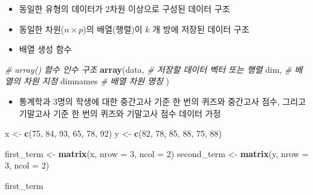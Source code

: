 \documentclass[
  11pt,
]{krantz}
\newenvironment{Shaded}{\begin{snugshade}}{\end{snugshade}}
\newcommand{\CommentTok}[1]{\textcolor[rgb]{0.37,0.37,0.37}{\textit{#1}}}
\newcommand{\DataTypeTok}[1]{\textcolor[rgb]{0.27,0.27,0.27}{#1}}
\newcommand{\DecValTok}[1]{\textcolor[rgb]{0.06,0.06,0.06}{#1}}
\newcommand{\KeywordTok}[1]{\textcolor[rgb]{0.27,0.27,0.27}{\textbf{#1}}}
\newcommand{\NormalTok}[1]{#1}
\newcommand{\StringTok}[1]{\textcolor[rgb]{0.5,0.5,0.5}{#1}}
\providecommand{\tightlist}{%
  \setlength{\itemsep}{0pt}\setlength{\parskip}{0pt}}
\begin{document}
\begin{itemize}
\tightlist
\item
  동일한 유형의 데이터가 2차원 이상으로 구성된 데이터 구조
\item
  동일한 차원(\(n\times p\))의 배열(행렬)이 \(k\) 개 방에 저장된 데이터 구조
\item
  배열 생성 함수
\end{itemize}

\footnotesize

\begin{Shaded}
\begin{Highlighting}[]
\CommentTok{# array() 함수 인수 구조}
\KeywordTok{array}\NormalTok{(data, }\CommentTok{# 저장할 데이터 벡터 또는 행렬}
\NormalTok{      dim,  }\CommentTok{# 배열의 차원 지정}
\NormalTok{      dimnames }\CommentTok{# 배열 차원 명칭}
\NormalTok{      )}
\end{Highlighting}
\end{Shaded}

\normalsize

\begin{itemize}
\tightlist
\item
  통계학과 3명의 학생에 대한 중간고사 기준 한 번의 퀴즈와 중간고사 점수, 그리고 기말고사 기준 한 번의 퀴즈와 기말고사 점수 데이터 가정
\end{itemize}

\footnotesize

\begin{Shaded}
\begin{Highlighting}[]
\NormalTok{x <-}\StringTok{ }\KeywordTok{c}\NormalTok{(}\DecValTok{75}\NormalTok{, }\DecValTok{84}\NormalTok{, }\DecValTok{93}\NormalTok{, }\DecValTok{65}\NormalTok{, }\DecValTok{78}\NormalTok{, }\DecValTok{92}\NormalTok{)}
\NormalTok{y <-}\StringTok{ }\KeywordTok{c}\NormalTok{(}\DecValTok{82}\NormalTok{, }\DecValTok{78}\NormalTok{, }\DecValTok{85}\NormalTok{, }\DecValTok{88}\NormalTok{, }\DecValTok{75}\NormalTok{, }\DecValTok{88}\NormalTok{)}

\NormalTok{first_term <-}\StringTok{ }\KeywordTok{matrix}\NormalTok{(x, }\DataTypeTok{nrow =} \DecValTok{3}\NormalTok{, }\DataTypeTok{ncol =} \DecValTok{2}\NormalTok{)}
\NormalTok{second_term <-}\StringTok{ }\KeywordTok{matrix}\NormalTok{(y, }\DataTypeTok{nrow =} \DecValTok{3}\NormalTok{, }\DataTypeTok{ncol =} \DecValTok{2}\NormalTok{)}

\NormalTok{first_term}
\end{Highlighting}
\end{Shaded}
\end{document}
